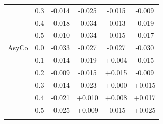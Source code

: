 \begin{small}
\begin{longtable}{llcccc}
 & 0.3 & -0.014 & -0.025 & -0.015 & -0.009 \\
 & 0.4 & -0.018 & -0.034 & -0.013 & -0.019 \\
 & 0.5 & -0.010 & -0.034 & -0.015 & -0.017 \\
\addlinespace
AsyCo & 0.0 & -0.033 & -0.027 & -0.027 & -0.030 \\
 & 0.1 & -0.014 & -0.019 & +0.004 & -0.015 \\
 & 0.2 & -0.009 & -0.015 & +0.015 & -0.009 \\
 & 0.3 & -0.014 & -0.023 & +0.000 & +0.015 \\
 & 0.4 & -0.021 & +0.010 & +0.008 & +0.017 \\
 & 0.5 & -0.025 & +0.009 & -0.015 & +0.025 \\
\addlinespace
\bottomrule
\end{longtable}
\end{small}
